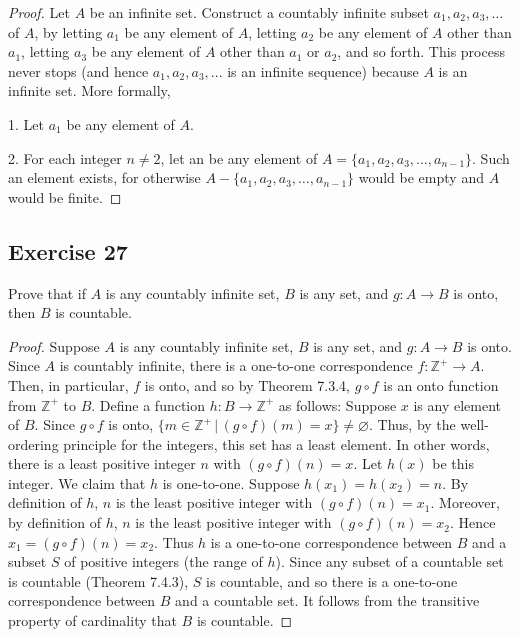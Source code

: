 \documentclass[14pt]{extarticle}
\newcommand{\es}{\varnothing}
\newcommand{\Z}{\mathbb{Z}}
\begin{document}
\begin{proof}
Let $A$ be an infinite set. Construct a countably infinite subset \(a_1, a_2, a_3, \ldots\) of $A$, by letting $a_1$ 
be any element of $A$, letting $a_2$ be any element of $A$ other than $a_1$, letting $a_3$ be any element of $A$ other 
than $a_1$ or $a_2$, and so forth. This process never stops (and hence \(a_1, a_2, a_3, \ldots\) is an infinite 
sequence) because $A$ is an infinite set. More formally,

1. Let $a_1$ be any element of $A$.

2. For each integer \(n \neq 2\), let an be any element of \(A = \{a_1, a_2, a_3, \ldots, a_{n-1}\}\). Such an element 
exists, for otherwise \(A - \{a_1, a_2, a_3, \ldots, a_{n-1}\}\) would be empty and $A$ would be finite.
\end{proof}

\subsection{Exercise 27}
Prove that if $A$ is any countably infinite set, $B$ is any set, and \(g: A \to B\) is onto, then $B$ is countable.

\begin{proof}
Suppose $A$ is any countably infinite set, $B$ is any set, and \(g: A \to B\) is onto. Since $A$ is countably 
infinite, there is a one-to-one correspondence \(f: \Z^+ \to A\). Then, in particular, $f$ is onto, and so by 
Theorem 7.3.4, \(g \circ f\) is an onto function from \(\Z^+\) to $B$. Define a function \(h: B \to \Z^+\) as 
follows: Suppose $x$ is any element of $B$. Since \(g \circ f\) is onto, \(\{m \in \Z^+ \, | \, (g \circ f)(m) = x\} 
\neq \es\). Thus, by the well-ordering principle for the integers, this set has a least element. In other words, 
there is a least positive integer $n$ with \((g \circ f)(n) = x\). Let $h(x)$ be this integer. We claim that $h$ is 
one-to-one. Suppose \(h(x_1) = h(x_2) = n\). By definition of $h$, $n$ is the least positive integer with \((g \circ 
f)(n) = x_1\). Moreover, by definition of $h$, $n$ is the least positive integer with \((g \circ f)(n) = x_2\). Hence 
\(x_1 = (g \circ f)(n) = x_2\). Thus $h$ is a one-to-one correspondence between $B$ and a subset $S$ of positive 
integers (the range of $h$). Since any subset of a countable set is countable (Theorem 7.4.3), $S$ is 
countable, and so there is a one-to-one correspondence between $B$ and a countable set. It follows from the 
transitive property of cardinality that $B$ is countable.
\end{proof}
\end{document}
